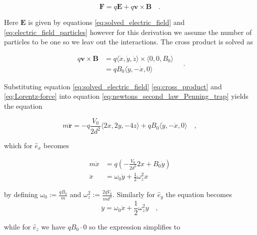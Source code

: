 \documentclass[../main_proj3.tex]{subfiles}
\begin{document}
\begin{equation}
    \label{eq:Lorentz-force}
    \mathbf{F} = q\mathbf{E} + q \mathbf{v} \times \mathbf{B} \quad .
\end{equation}

Here $\mathbf{E}$ is given by equations \eqref{eq:solved_electric_field} and \eqref{eq:electric_field_particles} however for this derivation we assume the number of particles to be one so we leav out the interactions. The cross product is solved as 

\begin{equation}
\label{eq:cross_product}
\begin{split}
q \mathbf{v} \times \mathbf{B} & =  q \bigl\langle 
\dot{x}, \dot{y}, \dot{z}
\bigr\rangle \times \bigl\langle 
0, 0, B_0
\bigr\rangle \\
&= qB_0 \bigl\langle
\dot{y}, -\dot{x}, 0
\bigr\rangle 
\end{split} \quad .
\end{equation}

Substituting equation \eqref{eq:solved_electric_field} \eqref{eq:cross_product} and \eqref{eq:Lorentz-force} into equation \eqref{eq:newtons_second_law_Penning_trap} yields the equation 

\begin{equation*}
m \mathbf{\ddot{r}} = - q \frac{V_0}{2d^{2}} 
\bigl\langle 
2x, 2y, -4z
\bigr\rangle + qB_0 \bigl\langle
\dot{y}, -\dot{x}, 0
\bigr\rangle  \quad,
\end{equation*}

which for $\hat{e}_x$ becomes

\begin{equation}
\label{eq:eq_of_motion_x}
\begin{split}
m \ddot{x} & = q(- \frac{V_0}{2d^{2}}2x + B_0 \dot{y}) \\
\ddot{x}  &= \omega_0 \dot{y} + \frac{1}{2} \omega_z^{2} x
\end{split}
\end{equation}

by defining $\omega_0 :=\frac{qB_0}{m}$ and $\omega_z^{2} := \frac{2qV_0}{md^{2}}$. Similarly for $\hat e_y$ the equation becomes 
\begin{equation}
\label{eq:eq_of_motion_y}
\ddot{y}  = \omega_0 \dot{x} + \frac{1}{2} \omega_z^{2} y \quad ,
\end{equation}

while for $\hat e_z$ we have $qB_0 \cdot 0$ so the expression simplifies to 
\end{document}
